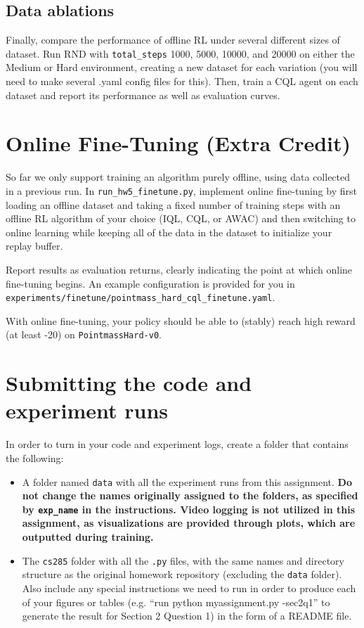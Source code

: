 \documentclass{article}
\begin{document}
\begin{sol}
    
\end{sol}

\subsection{Data ablations}
Finally, compare the performance of offline RL under several different sizes of dataset. Run RND with \verb+total_steps+ 1000, 5000, 10000, and 20000 on either the Medium or Hard environment, creating a new dataset for each variation (you will need to make several .yaml config files for this). Then, train a CQL agent on each dataset and report its performance as well as evaluation curves.

\begin{sol}
    
\end{sol}

\section{Online Fine-Tuning (Extra Credit)}
So far we only support training an algorithm purely offline, using data collected in a previous run. In \verb+run_hw5_finetune.py+, implement online fine-tuning by first loading an offline dataset and taking a fixed number of training steps with an offline RL algorithm of your choice (IQL, CQL, or AWAC) and then switching to online learning while keeping all of the data in the dataset to initialize your replay buffer.

Report results as evaluation returns, clearly indicating the point at which online fine-tuning begins. An example configuration is provided for you in \verb+experiments/finetune/pointmass_hard_cql_finetune.yaml+.

With online fine-tuning, your policy should be able to (stably) reach high reward (at least -20) on \verb+PointmassHard-v0+.

\section{Submitting the code and experiment runs}
In order to turn in your code and experiment logs, create a folder that contains the following: 
\begin{itemize}
    \item A folder named \texttt{data} with all the experiment runs from this assignment.
    \textbf{Do not change the names originally assigned to the folders, as specified by  \texttt{exp\_name} in the instructions. Video logging is not utilized in this assignment, as visualizations are provided through plots, which are outputted during training.}
    \item The \texttt{cs285} folder with all the \texttt{.py} files, with the same names and directory structure as the original homework repository (excluding the \texttt{data} folder). Also include any special instructions we need to run in order to produce each of your figures or tables (e.g. ``run python myassignment.py -sec2q1'' to generate the result for Section 2 Question 1) in the form of a README file.
\end{itemize}
\end{document}
